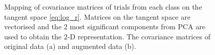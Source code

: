 \begin{figure}[ht!]
\begin{adjustbox}{center}
\end{adjustbox}
\caption{Mapping of covariance matrices of trials from each class on the tangent space \eqref{eq:log_r}. Matrices on the tangent space are vectorised and the 2 most significant components from PCA are used to obtain the 2-D representation. The covariance matrices of original data (a) and augmented data (b).} %
\label{fig:original-augmented}
\end{figure}

